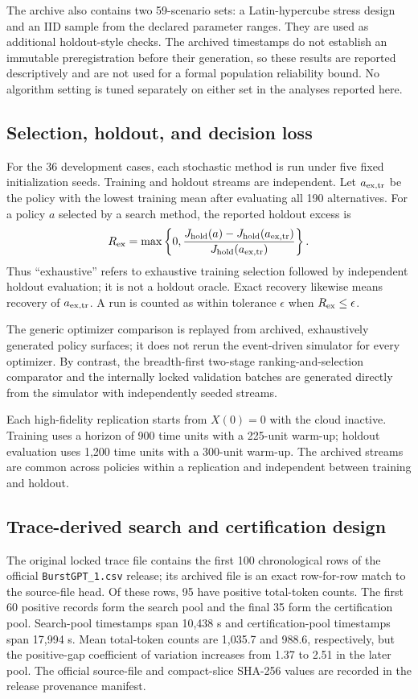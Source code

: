 \documentclass[preprint,12pt]{elsarticle}
\begin{document}
The archive also contains two 59-scenario sets: a Latin-hypercube stress design and an IID sample from the declared parameter ranges. They are used as additional holdout-style checks. The archived timestamps do not establish an immutable preregistration before their generation, so these results are reported descriptively and are not used for a formal population reliability bound. No algorithm setting is tuned separately on either set in the analyses reported here.

\subsection{Selection, holdout, and decision loss}

For the 36 development cases, each stochastic method is run under five fixed initialization seeds. Training and holdout streams are independent. Let $a_{\rm ex,tr}$ be the policy with the lowest training mean after evaluating all 190 alternatives. For a policy $a$ selected by a search method, the reported holdout excess is
\[
R_{\rm ex}=\max\left\{0,
\frac{J_{\rm hold}(a)-J_{\rm hold}(a_{\rm ex,tr})}
{J_{\rm hold}(a_{\rm ex,tr})}\right\}.
\]
Thus ``exhaustive'' refers to exhaustive training selection followed by independent holdout evaluation; it is not a holdout oracle. Exact recovery likewise means recovery of $a_{\rm ex,tr}$. A run is counted as within tolerance $\epsilon$ when $R_{\rm ex}\le\epsilon$.

The generic optimizer comparison is replayed from archived, exhaustively generated policy surfaces; it does not rerun the event-driven simulator for every optimizer. By contrast, the breadth-first two-stage ranking-and-selection comparator and the internally locked validation batches are generated directly from the simulator with independently seeded streams.

Each high-fidelity replication starts from $X(0)=0$ with the cloud inactive. Training uses a horizon of 900 time units with a 225-unit warm-up; holdout evaluation uses 1,200 time units with a 300-unit warm-up. The archived streams are common across policies within a replication and independent between training and holdout.

\subsection{Trace-derived search and certification design}
\label{sec:tracedesign}

The original locked trace file contains the first 100 chronological rows of the official \texttt{BurstGPT\_1.csv} release; its archived file is an exact row-for-row match to the source-file head. Of these rows, 95 have positive total-token counts. The first 60 positive records form the search pool and the final 35 form the certification pool. Search-pool timestamps span 10,438 s and certification-pool timestamps span 17,994 s. Mean total-token counts are 1,035.7 and 988.6, respectively, but the positive-gap coefficient of variation increases from 1.37 to 2.51 in the later pool. The official source-file and compact-slice SHA-256 values are recorded in the release provenance manifest.
\end{document}
